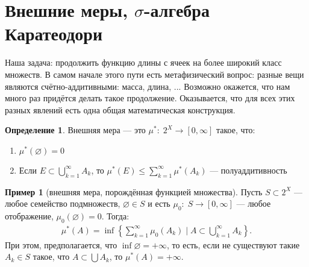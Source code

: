 \documentclass[a4paper,12pt]{article}
\newcounter{theoremCnt}
\theoremstyle{definition}
\newtheorem{df}[theoremCnt]{Определение}
\theoremstyle{plain}
\theoremstyle{plain}
\theoremstyle{plain}
\theoremstyle{plain}
\theoremstyle{definition}
\newtheorem{exmpl}[theoremCnt]{Пример}
\theoremstyle{definition}
\theoremstyle{definition}
\theoremstyle{definition}
\theoremstyle{definition}
\theoremstyle{definition}
\theoremstyle{plain}
\theoremstyle{plain}
\theoremstyle{plain}
\theoremstyle{plain}
\theoremstyle{definition}
\theoremstyle{definition}
\theoremstyle{definition}
\theoremstyle{definition}
\theoremstyle{definition}
\begin{document}

\section{Внешние меры, $ \sigma $-алгебра Каратеодори}

Наша задача: продолжить функцию длины с ячеек на более широкий класс множеств. В самом начале этого пути есть метафизический вопрос: разные вещи являются счётно-аддитивными: масса, длина, ... Возможно окажется, что нам много раз придётся делать такое продолжение. Оказывается, что для всех этих разных явлений есть одна общая математическая конструкция.

\begin{df}
 Внешняя мера --- это $ \mu^\ast \colon\; 2^X \to [0, \infty] $ такое, что:
 \begin{enumerate}
  \item $ \mu^\ast(\varnothing) = 0 $
  \item Если $ E \subset \displaystyle \bigcup_{k=1}^\infty A_k $, то $ \displaystyle \mu^\ast\left( E \right) \leqslant \sum_{k=1}^\infty \mu^\ast(A_k) $ --- полуаддитивность
 \end{enumerate}
\end{df}
\begin{exmpl}[внешняя мера, порождённая функцией множества]
 Пусть $ S \subset 2^X $ --- любое семейство подмножеств, $ \varnothing \in S $ и есть $ \mu_0 \colon\; S \to [0, \infty] $ --- любое отображение, $ \mu_0(\varnothing) = 0 $. Тогда:
 \begin{align*}
  \mu^\ast(A) = \inf \left\{ \sum_{k=1}^\infty \mu_0(A_k) \mid A \subset \bigcup_{k=1}^\infty A_k  \right\} 
 .\end{align*} При этом, предполагается, что $ \inf \varnothing = +\infty $, то есть, если не существуют такие $ A_k \in S $ такое, что $ A \subset \bigcup A_k $, то $ \mu^\ast (A) = +\infty $.
\end{exmpl}
\end{document}
